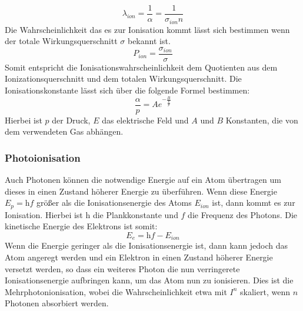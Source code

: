 \begin{equation}
    \lambda_{ion} = \frac{1}{\alpha} = \frac{1}{\sigma_{ion} n}
    \label{eq:middelwaylen}
\end{equation}
Die Wahrscheinlichkeit das es zur Ionisation kommt lässt sich bestimmen wenn der totale Wirkungsquerschnitt \(\sigma\) bekannt ist.
\begin{equation}
    P_{ion} = \frac{\sigma_{ion}}{\sigma}
    \label{eq:ionizationprop}
\end{equation}
Somit entspricht die Ionisationswahrscheinlichkeit dem Quotienten aus dem Ionizationsquerschnitt und dem totalen Wirkungsquerschnitt. Die Ionisationskonstante lässt sich über die folgende Formel bestimmen:
\begin{equation}
    \frac{\alpha}{p} = A e^{-\frac{B}{\frac{E}{p}}}
    \label{eq:ionconst}
\end{equation}
Hierbei ist \(p\) der Druck, \(E\) das elektrische Feld und \(A\) und \(B\) Konstanten, die von dem verwendeten Gas abhängen. \cite{cooray2014}

\subsubsection{Photoionisation}
Auch Photonen können die notwendige Energie auf ein Atom übertragen um dieses in einen Zustand höherer Energie zu überführen. Wenn diese Energie \(E_{p} = \mathrm{h}f\) größer als die Ionisationsenergie des Atoms \(E_{ion}\) ist, dann kommt es zur Ionisation. Hierbei ist \(\mathrm{h}\) die Plankkonstante und \(f\) die Frequenz des Photons. Die kinetische Energie des Elektrons ist somit:
\begin{equation}
    E_{e} = \mathrm{h}f - E_{ion}
    \label{eq:photoenergyion}
\end{equation}
Wenn die Energie geringer als die Ionisationsenergie ist, dann kann jedoch das Atom angeregt werden und ein Elektron in einen Zustand höherer Energie versetzt werden, so dass ein weiteres Photon die nun verringerete Ionisationsenergie aufbringen kann, um das Atom nun zu ionisieren. Dies ist die Mehrphotonionisation, wobei die Wahrscheinlichkeit etwa mit \(I^n\) skaliert, wenn \(n\) Photonen absorbiert werden.
\cite{kuffel2000}

